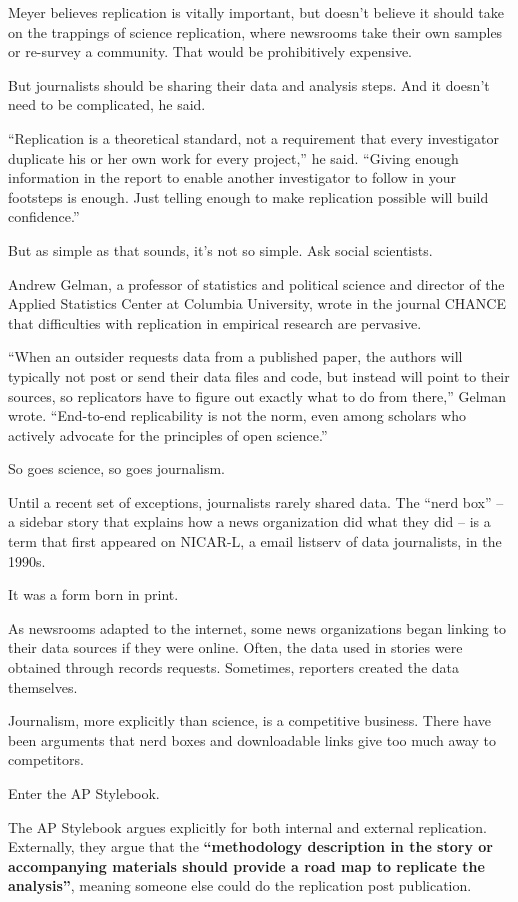 \documentclass[
  letterpaper,
  DIV=11,
  numbers=noendperiod]{scrreprt}
\begin{document}
Meyer believes replication is vitally important, but doesn't believe it
should take on the trappings of science replication, where newsrooms
take their own samples or re-survey a community. That would be
prohibitively expensive.

But journalists should be sharing their data and analysis steps. And it
doesn't need to be complicated, he said.

``Replication is a theoretical standard, not a requirement that every
investigator duplicate his or her own work for every project,'' he said.
``Giving enough information in the report to enable another investigator
to follow in your footsteps is enough. Just telling enough to make
replication possible will build confidence.''

But as simple as that sounds, it's not so simple. Ask social scientists.

Andrew Gelman, a professor of statistics and political science and
director of the Applied Statistics Center at Columbia University, wrote
in the journal CHANCE that difficulties with replication in empirical
research are pervasive.

``When an outsider requests data from a published paper, the authors
will typically not post or send their data files and code, but instead
will point to their sources, so replicators have to figure out exactly
what to do from there,'' Gelman wrote. ``End-to-end replicability is not
the norm, even among scholars who actively advocate for the principles
of open science.''

So goes science, so goes journalism.

Until a recent set of exceptions, journalists rarely shared data. The
``nerd box'' -- a sidebar story that explains how a news organization
did what they did -- is a term that first appeared on NICAR-L, a email
listserv of data journalists, in the 1990s.

It was a form born in print.

As newsrooms adapted to the internet, some news organizations began
linking to their data sources if they were online. Often, the data used
in stories were obtained through records requests. Sometimes, reporters
created the data themselves.

Journalism, more explicitly than science, is a competitive business.
There have been arguments that nerd boxes and downloadable links give
too much away to competitors.

Enter the AP Stylebook.

The AP Stylebook argues explicitly for both internal and external
replication. Externally, they argue that the \textbf{``methodology
description in the story or accompanying materials should provide a road
map to replicate the analysis''}, meaning someone else could do the
replication post publication.
\end{document}
